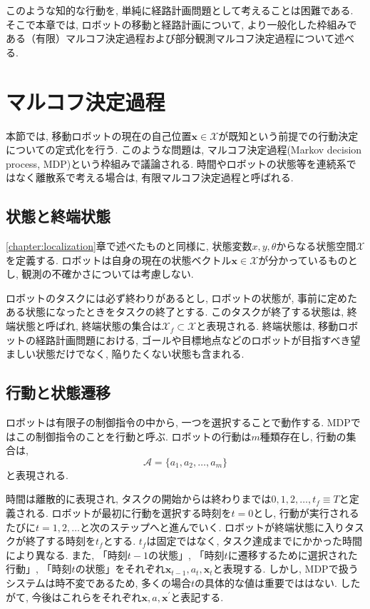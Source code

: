 このような知的な行動を, 単純に経路計画問題として考えることは困難である. 
そこで本章では, ロボットの移動と経路計画について, 
より一般化した枠組みである（有限）マルコフ決定過程および部分観測マルコフ決定過程について述べる. 



\section{マルコフ決定過程} \label{section:mdp}
本節では, 移動ロボットの現在の自己位置$\bm{x} \in \mathcal{X}$が既知という前提での行動決定についての定式化を行う. 
このような問題は, マルコフ決定過程(Markov decision process, MDP)という枠組みで議論される. 
時間やロボットの状態等を連続系ではなく離散系で考える場合は, 有限マルコフ決定過程と呼ばれる. 

\subsection{状態と終端状態}
\ref{chapter:localization}章で述べたものと同様に, 
状態変数$x,y,\theta$からなる状態空間$\mathcal{X}$を定義する. 
ロボットは自身の現在の状態ベクトル$\bm{x} \in \mathcal{X}$が分かっているものとし, 観測の不確かさについては考慮しない. 

ロボットのタスクには必ず終わりがあるとし, 
ロボットの状態が, 事前に定めたある状態になったときをタスクの終了とする. 
このタスクが終了する状態は, 終端状態と呼ばれ, 終端状態の集合は$\mathcal{X}_f \subset \mathcal{X}$と表現される. 
終端状態は, 移動ロボットの経路計画問題における, ゴールや目標地点などのロボットが目指すべき望ましい状態だけでなく, 陥りたくない状態も含まれる. 

\subsection{行動と状態遷移}
ロボットは有限子の制御指令の中から, 一つを選択することで動作する. 
MDPではこの制御指令のことを行動と呼ぶ. 
ロボットの行動は$m$種類存在し, 行動の集合は, 
\begin{equation}
\label{action}
  \mathcal{A} = \{ a_{1}, a_{2}, \ldots , a_{m} \}
\end{equation}
と表現される. 

時間は離散的に表現され, タスクの開始からは終わりまでは${0,1,2,\ldots,t_{f}} \equiv T$と定義される. 
ロボットが最初に行動を選択する時刻を$t=0$とし, 行動が実行されるたびに$t=1,2,\ldots$と次のステップへと進んでいく. 
ロボットが終端状態に入りタスクが終了する時刻を$t_{f}$とする. 
$t_{f}$は固定ではなく, タスク達成までにかかった時間により異なる. 
また, 「時刻$t-1$の状態」, 「時刻$t$に遷移するために選択された行動」, 「時刻$t$の状態」をそれぞれ$\bm{x}_{t-1}, a_{t}, \bm{x}_{t}$と表現する. 
しかし, MDPで扱うシステムは時不変であるため, 多くの場合$t$の具体的な値は重要でははない. 
したがて, 今後はこれらをそれぞれ$\bm{x}, a, \bm{x}^{\prime}$と表記する. 

